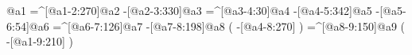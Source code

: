                    @{a1}%
    =^[@{a1-2}:270]@{a2}%
     -[@{a2-3}:330]@{a3}%
     =^[@{a3-4}:30]@{a4}%
     -[@{a4-5}:342]@{a5}%
      -[@{a5-6}:54]@{a6}%
    =^[@{a6-7}:126]@{a7}%
     -[@{a7-8}:198]@{a8}%
                      (
         -[@{a4-8}:270]%
                      )
    =^[@{a8-9}:150]@{a9}%
                      (
         -[@{a1-9}:210]%
                      )
